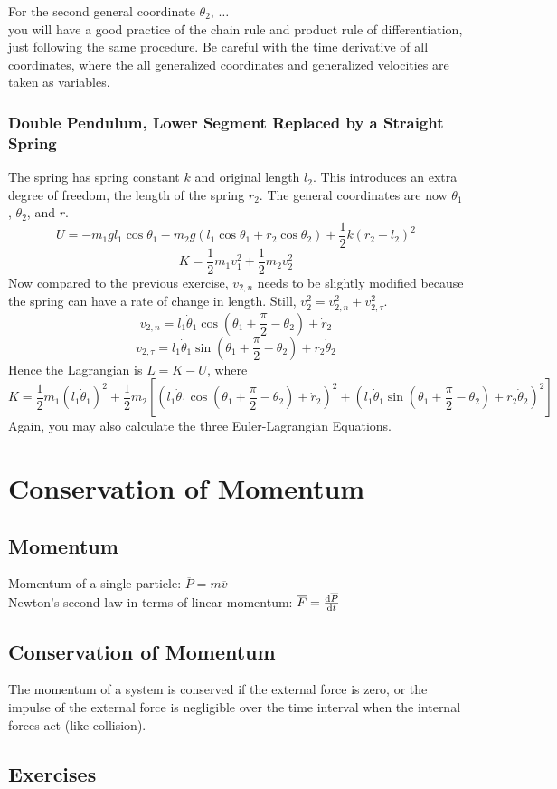\documentclass[a4paper,12pt,titlepage]{article}
\begin{document}
For the second general coordinate $\theta_2$, $\dots$ \\
you will have a good practice of the chain rule and product rule of differentiation, just following the same procedure. Be careful with the time derivative of all coordinates, where the all generalized coordinates and generalized velocities are taken as variables.
\subsubsection{Double Pendulum, Lower Segment Replaced by a Straight Spring}
The spring has spring constant $k$ and original length $l_2$. This introduces an extra degree of freedom, the length of the spring $r_2$. The general coordinates are now $\theta_1$, $\theta_2$, and $r$.
\[U=-m_1gl_1\cos\theta_1-m_2g(l_1\cos\theta_1+r_2\cos\theta_2)+\frac{1}{2}k(r_2-l_2)^2\]
\[K=\frac{1}{2}m_1v_1^2+\frac{1}{2}m_2v_2^2\]
Now compared to the previous exercise, $v_{2,n}$ needs to be slightly modified because the spring can have a rate of change in length. Still, $v_2^2=v_{2,n}^2+v_{2,\tau}^2$.\[v_{2,n}=l_1\dot\theta_1\cos(\theta_1+\frac{\pi}{2}-\theta_2)+\dot r_2\]\[v_{2,\tau}=l_1\dot\theta_1\sin(\theta_1+\frac{\pi}{2}-\theta_2)+r_2\dot\theta_2\]
Hence the Lagrangian is $L=K-U$, where
\[K=\frac{1}{2}m_1(l_1\dot\theta_1)^2+\frac{1}{2}m_2[(l_1\dot\theta_1\cos(\theta_1+\frac{\pi}{2}-\theta_2)+\dot r_2)^2+(l_1\dot\theta_1\sin(\theta_1+\frac{\pi}{2}-\theta_2)+r_2\dot\theta_2)^2]\]
Again, you may also calculate the three Euler-Lagrangian Equations.
\section{Conservation of Momentum}
\subsection{Momentum}
Momentum of a single particle: $\overline{P}=m\overline{v}$\\
Newton's second law in terms of linear momentum: $\overline F=\frac{\mathrm{d}\overline{P}}{\mathrm{d} t}$
\subsection{Conservation of Momentum}
The momentum of a system is conserved if the external force is zero, or the impulse of the external force is negligible over the time interval when the internal forces act (like collision).
\subsection{Exercises}
\end{document}
